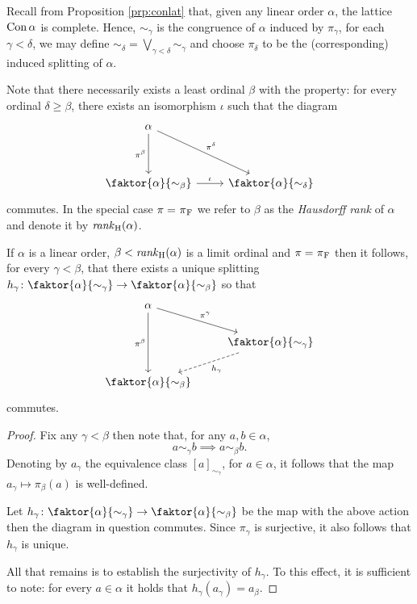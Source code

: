 Recall from Proposition \ref{prp:conlat} that, given any linear order $\alpha$,
the lattice $\operatorname{Con}\alpha$ is complete.  Hence, $\sim_\gamma$ is the congruence of
$\alpha$ induced by $\pi_\gamma$, for each $\gamma<\delta$, we may define
$\sim_\delta=\bigvee_{\gamma<\delta}\sim_\gamma$ and choose $\pi_\delta$ to be
the (corresponding) induced splitting of $\alpha$.

Note that there necessarily exists a least ordinal $\beta$ with the property:
for every ordinal $\delta\geq\beta$, there exists an isomorphism $\iota$ such
that the diagram
\begin{equation}
	\begin{tikzcd}
		\alpha\arrow[dd,"{\pi^\beta}"']\arrow[rdd,"{\pi^\delta}"]&\\
									 &\\
		\faktor{\alpha}{\sim_\beta}\arrow[r,"{\iota}"]&\faktor{\alpha}{\sim_\delta}
	\end{tikzcd}
\end{equation}
commutes.  In the special case $\pi=\prescript{}{}{\pi}_\mathrm{F}$ we refer to $\beta$ as the
\textit{Hausdorff rank} of $\alpha$ and denote it by $\mathit{rank}_\mathrm{H}(\alpha)$.

\begin{prp}
	If $\alpha$ is a linear order, $\beta<\mathit{rank}_\mathrm{H}(\alpha)$ is a limit ordinal
	and $\pi=\prescript{}{}{\pi}_\mathrm{F}$ then it follows, for every $\gamma<\beta$, that there
	exists a unique splitting
	$h_\gamma\colon\faktor{\alpha}{\sim_\gamma}\to\faktor{\alpha}{\sim_\beta}$ so that
	\begin{equation}
		\begin{tikzcd}
			\alpha\arrow[rd,"{\pi^\gamma}"]\arrow[dd,"{\pi^\beta}"']&\\
			&\faktor{\alpha}{\sim_{\gamma}}\arrow[ld,dashrightarrow,"{h_\gamma}"]\\
			\faktor{\alpha}{\sim_\beta}&
		\end{tikzcd}
	\end{equation}
	commutes.
\end{prp}
\begin{proof}
	Fix any $\gamma<\beta$ then note that, for any $a,b\in\alpha$,
	\begin{equation}
		a\sim_\gamma b\implies a\sim_\beta b.
	\end{equation}
	Denoting by $a_\gamma$ the equivalence class $[a]_{\sim_\gamma}$, for
	$a\in\alpha$, it follows that the map $a_\gamma\mapsto\pi_\beta(a)$ is
	well-defined.

	Let $h_\gamma\colon\faktor{\alpha}{\sim_\gamma}\to\faktor{\alpha}{\sim_\beta}$ be
	the map with the above action then the diagram in question commutes.  Since
	$\pi_\gamma$ is surjective, it also follows that $h_\gamma$ is unique.

	All that remains is to establish the surjectivity of $h_\gamma$.  To this
	effect, it is sufficient to note: for every $a\in\alpha$ it holds that
	$h_\gamma(a_{\gamma})=a_\beta$.

\end{proof}

